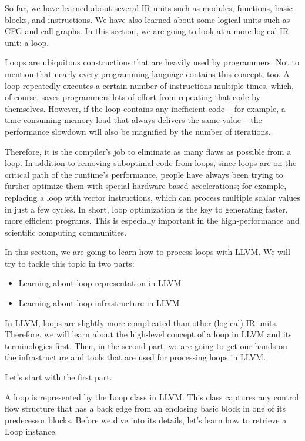 
So far, we have learned about several IR units such as modules, functions, basic blocks, and instructions. We have also learned about some logical units such as CFG and call graphs. In this section, we are going to look at a more logical IR unit: a loop.

Loops are ubiquitous constructions that are heavily used by programmers. Not to mention that nearly every programming language contains this concept, too. A loop repeatedly executes a certain number of instructions multiple times, which, of course, saves programmers lots of effort from repeating that code by themselves. However, if the loop contains any inefficient code – for example, a time-consuming memory load that always delivers the same value – the performance slowdown will also be magnified by the number of iterations.

Therefore, it is the compiler's job to eliminate as many flaws as possible from a loop. In addition to removing suboptimal code from loops, since loops are on the critical path of the runtime's performance, people have always been trying to further optimize them with special hardware-based accelerations; for example, replacing a loop with vector instructions, which can process multiple scalar values in just a few cycles. In short, loop optimization is the key to generating faster, more efficient programs. This is especially important in the high-performance and scientific computing communities. 

In this section, we are going to learn how to process loops with LLVM. We will try to tackle this topic in two parts:

\begin{itemize}
\item Learning about loop representation in LLVM
\item Learning about loop infrastructure in LLVM
\end{itemize}

In LLVM, loops are slightly more complicated than other (logical) IR units. Therefore, we will learn about the high-level concept of a loop in LLVM and its terminologies first. Then, in the second part, we are going to get our hands on the infrastructure and tools that are used for processing loops in LLVM.

Let's start with the first part.


A loop is represented by the Loop class in LLVM. This class captures any control flow structure that has a back edge from an enclosing basic block in one of its predecessor blocks. Before we dive into its details, let's learn how to retrieve a Loop instance.

